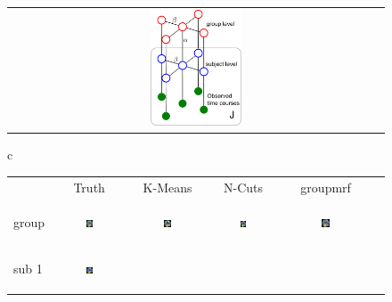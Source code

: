 \documentclass[12pt]{article}
\begin{document}
\begin{figure}[htb]
  \centering
  \begin{tabular}[b]{c}
    \includegraphics[width=0.25\textwidth]{figure1/grp2}
  \end{tabular}
  \hspace{5pt}
  \begin{tabular}[b]{c}
    \begin{tabular}[b]{lccccc}
      & \footnotesize Truth & \footnotesize \textsf{K-Means} & \footnotesize \textsf{N-Cuts} & \footnotesize \textsf{groupmrf}\\
      \begin{sideways} \footnotesize group \end{sideways} &
      \includegraphics[width=0.1\textwidth]{figure1/truegrp} &
      \includegraphics[width=0.1\textwidth]{figure1/kmeans_grp} &
      \includegraphics[width=0.1\textwidth]{figure1/ncuts_grp} &
      \includegraphics[width=0.1\textwidth]{figure1/mrf_grp} \\
      \begin{sideways} \footnotesize sub 1 \end{sideways} &
      \includegraphics[width=0.1\textwidth]{figure1/true_sub1} &

\end{tabular}
\end{tabular}
\end{figure}
\end{document}
